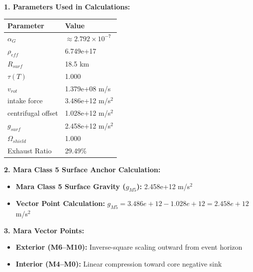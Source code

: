 \documentclass[11pt, a4paper]{article}
\begin{document}
\vspace{0.5em}
\noindent \textbf{1. Parameters Used in Calculations:}
\begin{center}
  \begin{tabular}{|l|l|}
    \hline
    \textbf{Parameter} & \textbf{Value} \\ \hline
    $\alpha_G$ & $\approx 2.792 \times 10^{-7}$ \\ \hline
    $\rho_{eff}$ & 6.749e+17 \\ \hline
    $R_{surf}$ & 18.5 km \\ \hline
    $\tau(T)$ & 1.000 \\ \hline
    $v_{rot}$ & 1.379e+08 m/s \\ \hline
    intake force & 3.486e+12 m/s$^2$ \\ \hline
    centrifugal offset & 1.028e+12 m/s$^2$ \\ \hline
    $g_{surf}$ & 2.458e+12 m/s$^2$ \\ \hline
    $\Omega_{shield}$ & 1.000 \\ \hline
    Exhaust Ratio & 29.49\% \\ \hline
  \end{tabular}
\end{center}

\vspace{0.5em}
\noindent \textbf{2. Mara Class 5 Surface Anchor Calculation:}
\begin{itemize}
  \item \textbf{Mara Class 5 Surface Gravity ($g_{M5}$):} 2.458e+12 m/s$^2$
  \item \textbf{Vector Point Calculation:} $g_{M5} = 3.486e+12 - 1.028e+12 = 2.458e+12$ m/s$^2$
\end{itemize}

\vspace{0.5em}
\noindent \textbf{3. Mara Vector Points:}
\begin{itemize}
  \item \textbf{Exterior (M6--M10):} Inverse-square scaling outward from event horizon
  \item \textbf{Interior (M4--M0):} Linear compression toward core negative sink
\end{itemize}
\end{document}
